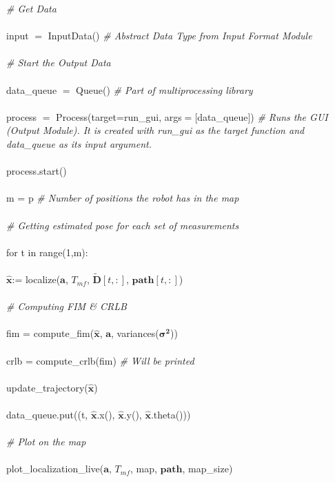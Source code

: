 \documentclass[12pt, titlepage]{article}
\begin{document}
\noindent \textit{\# Get Data}\\\\
\noindent input $=$ InputData() \textit{\# Abstract Data Type from Input Format Module}\\\\
\noindent \textit{\# Start the Output Data}\\\\
\noindent data\_queue $=$ Queue() \textit{\# Part of multiprocessing library}\\\\
\noindent process $=$ Process(target=run\_gui, args$=$[data\_queue]) \textit{\# Runs the GUI (Output Module). It is created with run\_gui as the target function and data\_queue as its input argument.}\\\\
\noindent process.start()\\\\
\noindent m = p \textit{\# Number of positions the robot has in the map}\\\\
\noindent \textit{\# Getting estimated pose for each set of measurements}\\\\
\noindent for t in range(1,m): \\\\
\indent $\mathbf{\hat{x}}$:= localize($\mathbf{a}$, $T_{mf}$, $\mathbf{\tilde{D}}[t,:]$, $\mathbf{path}[t,:]$)\\\\
\indent \textit{\# Computing FIM \& CRLB} \\\\
\indent  fim = compute\_fim($\mathbf{\hat{x}}$, $\mathbf{a}$, variances($\boldsymbol{\sigma^2}$))\\\\
\indent  crlb = compute\_crlb(fim) \textit{\# Will be printed}\\\\
\indent update\_trajectory($\mathbf{\hat{x}}$)\\\\
\indent data\_queue.put((t, $\mathbf{\hat{x}}$.x(), $\mathbf{\hat{x}}$.y(), $\mathbf{\hat{x}}$.theta()))\\\\
\noindent \textit{\# Plot on the map}\\\\
\noindent plot\_localization\_live($\mathbf{a}$, $T_{mf}$, map, $\mathbf{path}$, map\_size)
\end{document}
